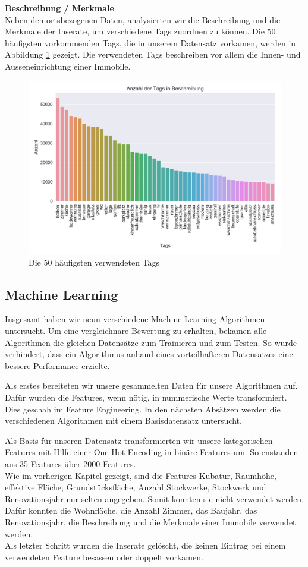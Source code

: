 \textbf{Beschreibung / Merkmale}\\
Neben den ortsbezogenen Daten, analysierten wir die Beschreibung und die Merkmale der Inserate, um verschiedene Tags zuordnen zu können. Die 50 häufigsten vorkommenden Tags, die in unserem Datensatz vorkamen, werden in Abbildung \ref{fig:tags} gezeigt. Die verwendeten Tags beschreiben vor allem die Innen- und Ausseneinrichtung einer Immobile.
%
\begin{figure}[ht]
\centering
\includegraphics[width=\textwidth]{images/tags.png}
\caption[Die 50 häufigsten verwendeten Tags]{Die 50 häufigsten verwendeten Tags}%
\label{fig:tags}
\end{figure}

\subsection{Machine Learning}
Insgesamt haben wir neun verschiedene Machine Learning Algorithmen untersucht. Um eine vergleichnare Bewertung zu erhalten, bekamen alle Algorithmen die gleichen Datensätze zum Trainieren und zum Testen. So wurde verhindert, dass ein Algorithmus anhand eines vorteilhafteren Datensatzes eine bessere Performance erzielte. 

Als erstes bereiteten wir unsere gesammelten Daten für unsere Algorithmen auf. Dafür wurden die Features, wenn nötig, in nummerische Werte transformiert. Dies geschah im Feature Engineering. In den nächsten Absätzen werden die verschiedenen Algorithmen mit einem Basisdatensatz untersucht.

Als Basis für unseren Datensatz transformierten wir unsere kategorischen Features mit Hilfe einer One-Hot-Encoding in binäre Features um. So enstanden aus 35 Features über 2000 Features.\\
Wie im vorherigen Kapitel gezeigt, sind die Features Kubatur, Raumhöhe, effektive Fläche, Grundstücksfläche, Anzahl Stockwerke, Stockwerk und Renovationsjahr nur selten angegeben. Somit konnten sie nicht verwendet werden. Dafür konnten die Wohnfläche, die Anzahl Zimmer, das Baujahr, das Renovationsjahr, die Beschreibung und die Merkmale einer Immobile verwendet werden.\\
Als letzter Schritt wurden die Inserate gelöscht, die keinen Eintrag bei einem verwendeten Feature besassen oder doppelt vorkamen.

